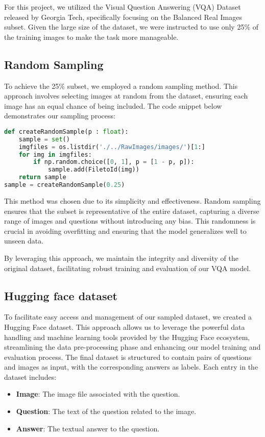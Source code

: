 \documentclass[conference]{IEEEtran}
\begin{document}
For this project, we utilized the Visual Question Answering (VQA) Dataset released by Georgia Tech, specifically focusing on the Balanced Real Images subset. Given the large size of the dataset, we were instructed to use only 25\% of the training images to make the task more manageable. 

\subsection*{Random Sampling}
To achieve the 25\% subset, we employed a random sampling method. This approach involves selecting images at random from the dataset, ensuring each image has an equal chance of being included. The code snippet below demonstrates our sampling process:

\begin{lstlisting}[language=Python]
def createRandomSample(p : float):
    sample = set()
    imgfiles = os.listdir('./../RawImages/images/')[1:]
    for img in imgfiles:
        if np.random.choice([0, 1], p = [1 - p, p]):
            sample.add(FiletoId(img))
    return sample
sample = createRandomSample(0.25)
\end{lstlisting}

This method was chosen due to its simplicity and effectiveness. Random sampling ensures that the subset is representative of the entire dataset, capturing a diverse range of images and questions without introducing any bias. This randomness is crucial in avoiding overfitting and ensuring that the model generalizes well to unseen data.

By leveraging this approach, we maintain the integrity and diversity of the original dataset, facilitating robust training and evaluation of our VQA model.

\subsection*{Hugging face dataset}

To facilitate easy access and management of our sampled dataset, we created a Hugging Face dataset. This approach allows us to leverage the powerful data handling and machine learning tools provided by the Hugging Face ecosystem, streamlining the data pre-processing phase and enhancing our model training and evaluation process.
The final dataset is structured to contain pairs of questions and images as input, with the corresponding answers as labels. Each entry in the dataset includes:
\begin{itemize}
    \item \textbf{Image}: The image file associated with the question.
    \item \textbf{Question}: The text of the question related to the image.
    \item \textbf{Answer}: The textual answer to the question.
\end{itemize}
\end{document}
